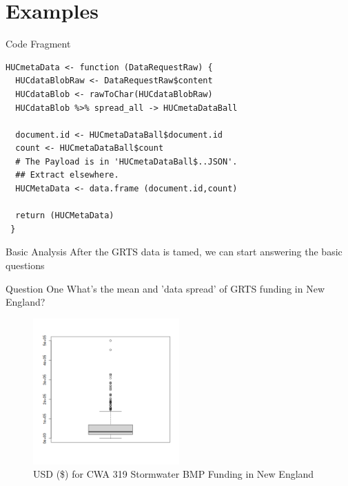 \documentclass{beamer}
\begin{document}
\section{Examples}

\begin{frame}[fragile]{Code Fragment}
\begin{verbatim}
HUCmetaData <- function (DataRequestRaw) {
  HUCdataBlobRaw <- DataRequestRaw$content
  HUCdataBlob <- rawToChar(HUCdataBlobRaw)
  HUCdataBlob %>% spread_all -> HUCmetaDataBall
  
  document.id <- HUCmetaDataBall$document.id 
  count <- HUCmetaDataBall$count  
  # The Payload is in 'HUCmetaDataBall$..JSON'. 
  ## Extract elsewhere.
  HUCMetaData <- data.frame (document.id,count) 

  return (HUCMetaData) 
 }

\end{verbatim}
\end{frame}

\begin{frame}{Basic Analysis}
  After the GRTS data is tamed, we can start answering the basic
  questions
 
\end{frame}
\begin{frame}{Question One}
  What's the mean and 'data spread' of GRTS
  funding in New England?
  \begin{figure}
    \centering
    \includegraphics[width=0.50\textwidth]{funds_319.png}
    \caption{USD (\$) for CWA 319 Stormwater BMP Funding in New England}
  \end{figure}
\end{frame}
\end{document}

